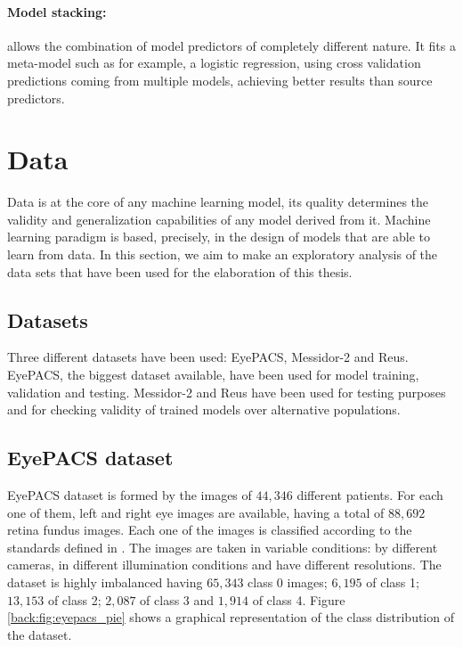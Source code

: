 \paragraph{Model stacking:} allows the combination of model predictors of completely different nature. It fits a meta-model such as for example, a logistic regression, using cross validation predictions coming from multiple models, achieving better results than source predictors.


\section{Data}

Data is at the core of any machine learning model, its quality determines the validity and generalization capabilities of any model derived from it. Machine learning paradigm is based, precisely, in the design of models that are able to learn from data. In this section, we aim to make an exploratory analysis of the data sets that have been used for the elaboration of this thesis. 

\subsection{Datasets}

Three different datasets have been used: EyePACS, Messidor-2 and Reus. EyePACS, the biggest dataset available, have been used for model training, validation and testing. Messidor-2 and Reus have been used for testing purposes and for checking validity of trained models over alternative populations.

\subsection{EyePACS dataset}\label{dataset:eyepacs}

EyePACS dataset \citep{eyepacs_kaggle} is formed by the images of $44,346$ different patients. For each one of them, left and right eye images are available, having a total of $88,692$ retina fundus images. Each one of the images is classified according to the standards defined in \citep{diaclass}. The images are taken in variable conditions: by different cameras, in different illumination conditions and have different resolutions. The dataset is highly imbalanced having $65,343$ class 0 images; $6,195$ of class 1; $13,153$ of class 2; $2,087$ of class 3 and $1,914$ of class 4. Figure \ref{back:fig:eyepacs_pie} shows a graphical representation of the class distribution of the dataset.


